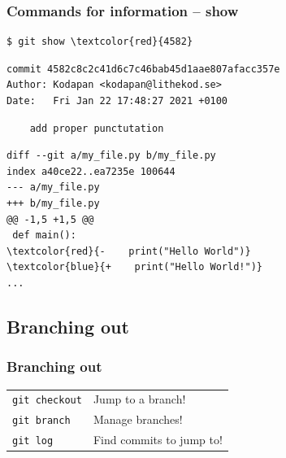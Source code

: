 \documentclass{beamer}
\begin{document}
\begin{frame}[fragile]
  \frametitle{Commands for information -- show}
\begin{Verbatim}[commandchars=\\\{\}]
$ git show \textcolor{red}{4582}
\end{Verbatim}
\pause{}
\vspace{-2.5ex}
\begin{verbatim}
commit 4582c8c2c41d6c7c46bab45d1aae807afacc357e
Author: Kodapan <kodapan@lithekod.se>
Date:   Fri Jan 22 17:48:27 2021 +0100
\end{verbatim}
\vspace{-3ex}
\begin{verbatim}
    add proper punctutation
\end{verbatim}
\vspace{-2ex}
\begin{Verbatim}[commandchars=\\\{\}]
diff --git a/my_file.py b/my_file.py
index a40ce22..ea7235e 100644
--- a/my_file.py
+++ b/my_file.py
@@ -1,5 +1,5 @@
 def main():
\textcolor{red}{-    print("Hello World")}
\textcolor{blue}{+    print("Hello World!")}
...
\end{Verbatim}
\end{frame}

\subsection{Branching out}

\begin{frame}[fragile]
  \frametitle{Branching out}

  \begin{tabular}{ll}
    \texttt{git checkout} & Jump to a branch! \\
    \texttt{git branch} & Manage branches! \\
    \texttt{git log} & Find commits to jump to! \\
  \end{tabular}

\end{frame}
\end{document}
